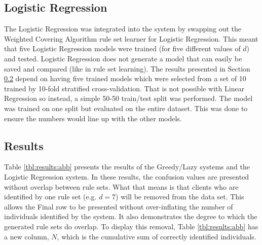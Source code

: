 
\subsection{Logistic Regression}
The Logistic Regression was integrated into the \Abb system by swapping out the Weighted Covering Algorithm rule set learner for Logistic Regression. This meant that five Logistic Regression models were trained (for five different values of $d$) and tested. 
Logistic Regression does not generate a model that can easily be saved and compared (like in rule set learning). The results presented in Section \ref{chap:results:rugresults} depend on having five trained models which were selected from a set of 10 trained by 10-fold stratified cross-validation. That is not possible with Linear Regression so instead, a simple 50-50 train/test split was performed. The model was trained on one split but evaluated on the entire dataset. This was done to ensure the numbers would line up with the other models.


\subsection{Results} \label{chap:results:rugresults}

Table \ref{tbl:results:abb} presents the results of the Greedy/Lazy systems and the Logistic Regression system.
In these results, the confusion values are presented without overlap between rule sets. What that means is that clients who are identified by one rule set (e.g. $d=7$) will be removed from the data set. This allows the Final row to be presented without over-inflating the number of individuals identified by the system. It also demonstrates the degree to which the generated rule sets do overlap. To display this removal, Table \ref{tbl:results:abb} has a new column, $N$, which is the cumulative sum of correctly identified individuals.

